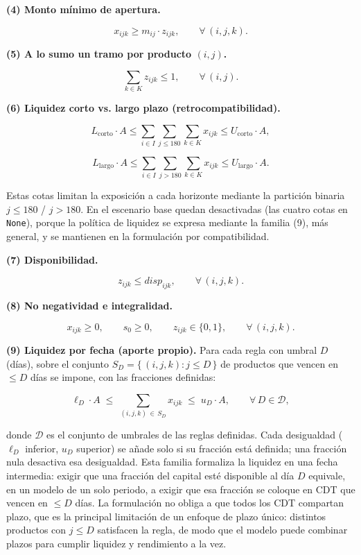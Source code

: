 \documentclass[11pt,a4paper]{article}
\begin{document}
\textbf{(4) Monto mínimo de apertura.}

\[
x_{ijk} \ge m_{ij} \cdot z_{ijk}, \qquad \forall\, (i, j, k) .
\]

\textbf{(5) A lo sumo un tramo por producto $(i, j)$.}

\[
\sum_{k \in K} z_{ijk} \le 1, \qquad \forall\, (i, j) .
\]

\textbf{(6) Liquidez corto vs. largo plazo (retrocompatibilidad).}

\[
L_{\text{corto}} \cdot A \le \sum_{i \in I} \sum_{j \le 180} \sum_{k \in K} x_{ijk} \le U_{\text{corto}} \cdot A ,
\]

\[
L_{\text{largo}} \cdot A \le \sum_{i \in I} \sum_{j > 180} \sum_{k \in K} x_{ijk} \le U_{\text{largo}} \cdot A .
\]

Estas cotas limitan la exposición a cada horizonte mediante la partición binaria $j \le 180$ / $j > 180$. En el escenario base quedan desactivadas (las cuatro cotas en \texttt{None}), porque la política de liquidez se expresa mediante la familia (9), más general, y se mantienen en la formulación por compatibilidad.

\textbf{(7) Disponibilidad.}

\[
z_{ijk} \le disp_{ijk}, \qquad \forall\, (i, j, k) .
\]

\textbf{(8) No negatividad e integralidad.}

\[
x_{ijk} \ge 0, \qquad s_0 \ge 0, \qquad z_{ijk} \in \{0, 1\}, \qquad \forall\, (i, j, k) .
\]

\textbf{(9) Liquidez por fecha (aporte propio).} Para cada regla con umbral $D$ (días), sobre el conjunto $S_D = \{\, (i, j, k) : j \le D \,\}$ de productos que vencen en $\le D$ días se impone, con las fracciones definidas:

\[
\ell_D \cdot A \;\le\; \sum_{(i,j,k)\,\in\, S_D} x_{ijk} \;\le\; u_D \cdot A , \qquad \forall\, D \in \mathcal{D} ,
\]

donde $\mathcal{D}$ es el conjunto de umbrales de las reglas definidas. Cada desigualdad ($\ell_D$ inferior, $u_D$ superior) se añade solo si su fracción está definida; una fracción nula desactiva esa desigualdad. Esta familia formaliza la liquidez en una fecha intermedia: exigir que una fracción del capital esté disponible al día $D$ equivale, en un modelo de un solo periodo, a exigir que esa fracción se coloque en CDT que vencen en $\le D$ días. La formulación no obliga a que todos los CDT compartan plazo, que es la principal limitación de un enfoque de plazo único: distintos productos con $j \le D$ satisfacen la regla, de modo que el modelo puede combinar plazos para cumplir liquidez y rendimiento a la vez.
\end{document}
